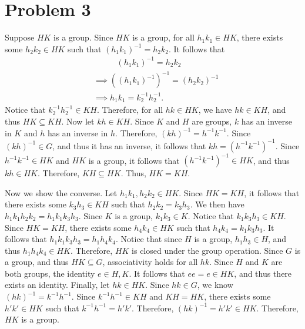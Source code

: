 \documentclass[11pt, letterpaper]{report}
\begin{document}
\section*{Problem 3}
\begin{solution}
Suppose $HK$ is a group. Since $HK$ is a group, for all $h_1k_1\in HK$, there exists some $h_2k_2\in H K$ such that $\left( h_1k_1 \right) ^{-1}=h_2k_2$. It follows that
\begin{align*}
	&\qquad\;\;\;\left( h_1k_1 \right) ^{-1} = h_2k_2\\
	&\implies \left( \left( h_1k_1 \right) ^{-1} \right) ^{-1}=\left( h_2k_2 \right) ^{-1}\\
	&\implies h_1k_1 = k_2^{-1}h_2^{-1}
.\end{align*}
Notice that $k_2^{-1}h_2^{-1}\in KH$. Therefore, for all $hk\in HK$, we have $hk\in KH$, and thus $HK \subseteq KH$. Now let $kh\in KH$. Since  $K$ and $H$ are groups, $k$ has an inverse in $K$ and $h$ has an inverse in $h$. Therefore, $\left( kh \right) ^{-1}=h^{-1}k^{-1}$. Since $\left( kh \right) ^{-1}\in G$, and thus it has an inverse, it follows that $kh= \left( h^{-1}k^{-1} \right) ^{-1}$. Since $h^{-1}k^{-1}\in HK$ and $HK$ is a group, it follows that $\left( h^{-1}k^{-1} \right) ^{-1}\in HK$, and thus $kh\in HK$. Therefore, $KH\subseteq HK$. Thus, $HK=KH$.

Now we show the converse. Let $h_1k_1,h_2k_2\in HK$. Since $HK=KH$, it follows that there exists some $k_3h_3\in KH$ such that $h_2k_2=k_3h_3$. We then have $h_1k_1h_2k_2=h_1k_1k_3h_3$. Since $K$ is a group, $k_1k_3\in K$. Notice that $k_1k_3h_3\in KH$. Since $HK=KH$, there exists some $h_4k_4\in HK$ such that $h_4k_4=k_1k_3h_3$. It follows that $h_1k_1k_3h_3=h_1h_4k_4$. Notice that since $H$ is a group, $h_1h_3\in H$, and thus $h_1h_4k_4\in HK$. Therefore, $HK$ is closed under the group operation. Since $G$ is a group, and thus $HK \subseteq G$, associativity holds for all $hk$. Since $H$ and $K$ are both groups, the identity $e\in H,K$. It follows that $ee=e\in HK$, and thus there exists an identity. Finally, let $hk\in HK$. Since $hk\in G$, we know $\left( hk \right) ^{-1}=k^{-1}h^{-1}$. Since $k^{-1}h^{-1}\in KH$ and $KH=HK$, there exists some $h'k' \in HK$ such that $k^{-1}h^{-1}=h'k'$. Therefore, $(hk)^{-1}=h'k'\in HK$. Therefore, $HK$ is a group.
\end{solution}
\end{document}
